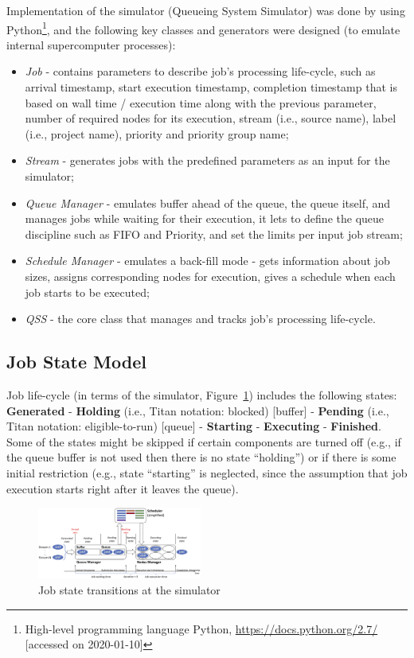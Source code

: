 Implementation of the simulator (Queueing System Simulator) \cite{ref-qss}
was done by using Python\footnote{High-level programming language Python,
\url{https://docs.python.org/2.7/} [accessed on 2020-01-10]}, and the
following key classes and generators were designed (to emulate internal
supercomputer processes):
\begin{itemize}
    \item \textit{Job} - contains parameters to describe job's processing
    life-cycle, such as arrival timestamp, start execution timestamp,
    completion timestamp that is based on wall time / execution time along
    with the previous parameter, number of required nodes for its execution,
    stream (i.e., source name), label (i.e., project name), priority and
    priority group name;
    \item \textit{Stream} - generates jobs with the predefined parameters as
    an input for the simulator;
    \item \textit{Queue Manager} - emulates buffer ahead of the queue, the
    queue itself, and manages jobs while waiting for their execution, it
    lets to define the queue discipline such as FIFO and Priority, and set
    the limits per input job stream;
    \item \textit{Schedule Manager} - emulates a back-fill mode - gets
    information about job sizes, assigns corresponding nodes for execution,
    gives a schedule when each job starts to be executed;
    \item \textit{QSS} - the core class that manages and tracks job's
    processing life-cycle.
\end{itemize}

\subsection{Job State Model} \label{appendix-simulator-description-2}

Job life-cycle (in terms of the simulator, Figure~\ref{fig-simulator-scheme})
includes the following states: \textbf{Generated} - \textbf{Holding} (i.e.,
Titan notation: blocked) [buffer] - \textbf{Pending} (i.e., Titan notation:
eligible-to-run) [queue] - \textbf{Starting} - \textbf{Executing} -
\textbf{Finished}.
Some of the states might be skipped if certain components are turned off (e.g.,
if the queue buffer is not used then there is no state ``holding'') or if there
is some initial restriction (e.g., state ``starting'' is neglected, since the
assumption that job execution starts right after it leaves the queue).

\begin{figure}
    \centering
    \includegraphics[width=0.48\textwidth]{pics/simulator-scheme.png}
    \caption{Job state transitions at the simulator}
    \label{fig-simulator-scheme}
\end{figure}
